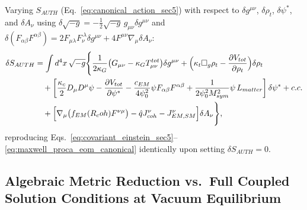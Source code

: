 \documentclass[american,11pt,letterpaper]{article}
\newcommand{\Rcoh}{R_{\mathrm{coh}}}
\def\mathcal#1{#1}%
\def\mathrm#1{#1}%
\def\Rcoh{R_coh}%
\begin{document}
Varying $S_{\mathrm{AUTH}}$ (Eq.~\eqref{eq:canonical_action_sec5}) with respect to $\delta g^{\mu\nu}$, $\delta\rho_t$, $\delta\psi^*$, and $\delta A_\nu$ using $\delta\sqrt{-g} = -\frac{1}{2}\sqrt{-g}\,g_{\mu\nu}\delta g^{\mu\nu}$ and $\delta(F_{\alpha\beta}F^{\alpha\beta}) = 2 F_{\mu\lambda}F_\nu^{\ \lambda}\delta g^{\mu\nu} + 4 F^{\mu\nu}\nabla_\mu\delta A_\nu$:
\begin{align}
\delta S_{\mathrm{AUTH}}
&= \int d^4x\,\sqrt{-g}\Biggl\{
  \frac{1}{2\kappa_G}\bigl(G_{\mu\nu} - \kappa_G T_{\mu\nu}^{\mathrm{tot}}\bigr)\delta g^{\mu\nu}
  + \Bigl(\kappa_t\Box_g\rho_t - \frac{\partial V_{\mathrm{tot}}}{\partial\rho_t}\Bigr)\delta\rho_t
  \nonumber\\
&\quad + \left[
    \frac{\kappa_c}{2}D_\mu D^\mu\psi
    - \frac{\partial V_{\mathrm{tot}}}{\partial\psi^*}
    - \frac{c_{\mathrm{EM}}}{4\psi_0^2}\psi F_{\alpha\beta}F^{\alpha\beta}
    + \frac{1}{2\psi_0^2 M_{\mathrm{sym}}^2}\psi\,\mathcal{L}_{\mathrm{matter}}
  \right]\delta\psi^* + \mathrm{c.c.}
  \nonumber\\
&\quad + \Bigl[\nabla_\mu\bigl(f_{\mathrm{EM}}(\Rcoh)F^{\nu\mu}\bigr) - \hat{q}J^\nu_{\mathrm{coh}} - J^\nu_{\mathrm{EM,SM}}\Bigr]\delta A_\nu
\Biggr\},
\label{eq:appD_full_variation}
\end{align}
reproducing Eqs.~\eqref{eq:covariant_einstein_sec5}--\eqref{eq:maxwell_proca_eom_canonical} identically upon setting $\delta S_{\mathrm{AUTH}} = 0$.

\subsection{Algebraic Metric Reduction vs.\ Full Coupled Solution Conditions at Vacuum Equilibrium}
\end{document}
